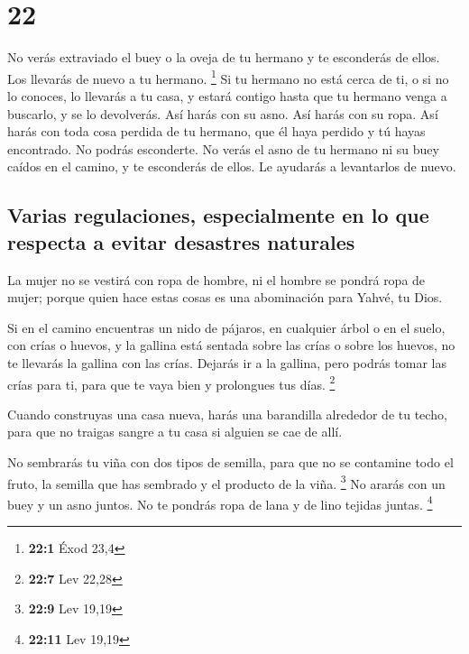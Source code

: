 \hypertarget{section-21}{%
\section{22}\label{section-21}}

 No verás extraviado el buey o la oveja de tu hermano y te
esconderás de ellos. Los llevarás de nuevo a tu hermano. \footnote{\textbf{22:1}
  Éxod 23,4}  Si tu hermano no está cerca de ti, o si no
lo conoces, lo llevarás a tu casa, y estará contigo hasta que tu hermano
venga a buscarlo, y se lo devolverás.  Así harás con su
asno. Así harás con su ropa. Así harás con toda cosa perdida de tu
hermano, que él haya perdido y tú hayas encontrado. No podrás
esconderte.  No verás el asno de tu hermano ni su buey
caídos en el camino, y te esconderás de ellos. Le ayudarás a levantarlos
de nuevo.

\hypertarget{varias-regulaciones-especialmente-en-lo-que-respecta-a-evitar-desastres-naturales}{%
\subsection{Varias regulaciones, especialmente en lo que respecta a
evitar desastres
naturales}\label{varias-regulaciones-especialmente-en-lo-que-respecta-a-evitar-desastres-naturales}}

 La mujer no se vestirá con ropa de hombre, ni el hombre
se pondrá ropa de mujer; porque quien hace estas cosas es una
abominación para Yahvé, tu Dios.

 Si en el camino encuentras un nido de pájaros, en
cualquier árbol o en el suelo, con crías o huevos, y la gallina está
sentada sobre las crías o sobre los huevos, no te llevarás la gallina
con las crías.  Dejarás ir a la gallina, pero podrás tomar
las crías para ti, para que te vaya bien y prolongues tus días.
\footnote{\textbf{22:7} Lev 22,28}

 Cuando construyas una casa nueva, harás una barandilla
alrededor de tu techo, para que no traigas sangre a tu casa si alguien
se cae de allí.

 No sembrarás tu viña con dos tipos de semilla, para que
no se contamine todo el fruto, la semilla que has sembrado y el producto
de la viña. \footnote{\textbf{22:9} Lev 19,19}  No ararás
con un buey y un asno juntos.  No te pondrás ropa de lana
y de lino tejidas juntas. \footnote{\textbf{22:11} Lev 19,19}

